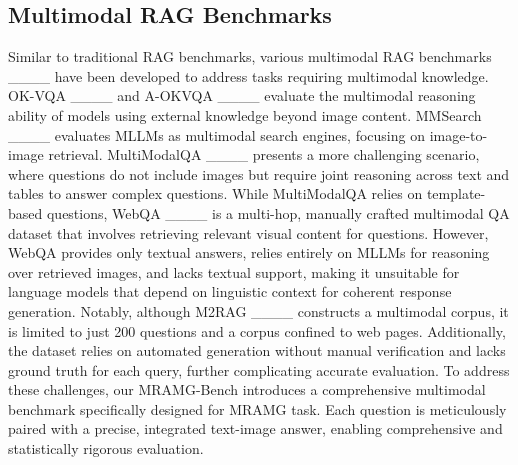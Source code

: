 \subsection{Multimodal RAG Benchmarks}
Similar to traditional RAG benchmarks, various multimodal RAG benchmarks ____ have been developed to address tasks requiring multimodal knowledge. OK-VQA ____ and A-OKVQA ____ evaluate the multimodal reasoning ability of models using external knowledge beyond image content. MMSearch ____ evaluates MLLMs as multimodal search engines, focusing on image-to-image retrieval. MultiModalQA ____ presents a more challenging scenario, where questions do not include images but require joint reasoning across text and tables to answer complex questions. While MultiModalQA relies on template-based questions, WebQA ____ is a multi-hop, manually crafted multimodal QA dataset that involves retrieving relevant visual content for questions.
However, WebQA provides only textual answers, relies entirely on MLLMs for reasoning over retrieved images, and lacks textual support, making it unsuitable for language models that depend on linguistic context for coherent response generation. Notably, although M2RAG ____ constructs a multimodal corpus, it is limited to just 200 questions and a corpus confined to web pages. Additionally, the dataset relies on automated generation without manual verification and lacks ground truth for each query, further complicating accurate evaluation.
To address these challenges, our MRAMG-Bench introduces a comprehensive multimodal benchmark specifically designed for MRAMG task. Each question is meticulously paired with a precise, integrated text-image answer, enabling comprehensive and statistically rigorous evaluation.





